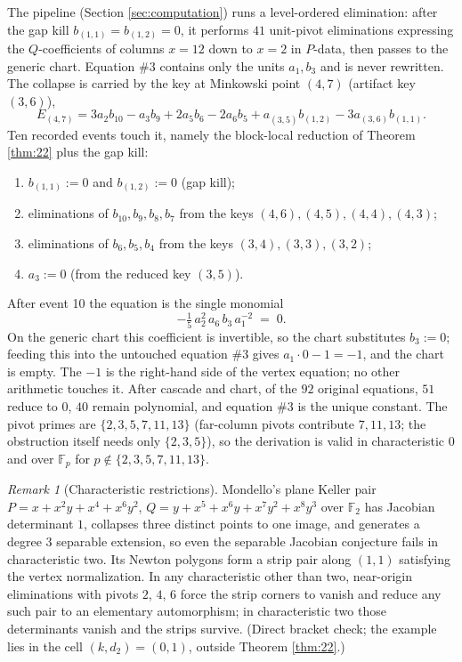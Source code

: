 \documentclass[11pt]{article}
\theoremstyle{definition}
\theoremstyle{remark}
\newtheorem{remark}[theorem]{Remark}
\begin{document}
The pipeline (Section \ref{sec:computation}) runs a level-ordered elimination: after the gap kill $b_{(1,1)}=b_{(1,2)}=0$, it performs $41$ unit-pivot eliminations expressing the $Q$-coefficients of columns $x=12$ down to $x=2$ in $P$-data, then passes to the generic chart. Equation $\#3$ contains only the units $a_1,b_3$ and is never rewritten. The collapse is carried by the key at Minkowski point $(4,7)$ (artifact key $(3,6)$),
\[
E_{(4,7)}=3a_2b_{10}-a_3b_9+2a_5b_6-2a_6b_5+a_{(3,5)}b_{(1,2)}-3a_{(3,6)}b_{(1,1)} .
\]
Ten recorded events touch it, namely the block-local reduction of Theorem \ref{thm:22} plus the gap kill:
\begin{enumerate}
\item[1--2.] $b_{(1,1)}:=0$ and $b_{(1,2)}:=0$ (gap kill);
\item[3--6.] eliminations of $b_{10},b_9,b_8,b_7$ from the keys $(4,6),(4,5),(4,4),(4,3)$;
\item[7--9.] eliminations of $b_6,b_5,b_4$ from the keys $(3,4),(3,3),(3,2)$;
\item[10.] $a_3:=0$ (from the reduced key $(3,5)$).
\end{enumerate}
After event 10 the equation is the single monomial
\[
-\tfrac{1}{5}\,a_2^2\,a_6\,b_3\,a_1^{-2}\;=\;0 .
\]
On the generic chart this coefficient is invertible, so the chart substitutes $b_3:=0$; feeding this into the untouched equation $\#3$ gives $a_1\cdot 0-1=-1$, and the chart is empty. The $-1$ is the right-hand side of the vertex equation; no other arithmetic touches it. After cascade and chart, of the $92$ original equations, $51$ reduce to $0$, $40$ remain polynomial, and equation $\#3$ is the unique constant. The pivot primes are $\{2,3,5,7,11,13\}$ (far-column pivots contribute $7,11,13$; the obstruction itself needs only $\{2,3,5\}$), so the derivation is valid in characteristic $0$ and over $\mathbb{F}_p$ for $p\notin\{2,3,5,7,11,13\}$.

\begin{remark}[Characteristic restrictions]
Mondello's plane Keller pair $P = x + x^2y + x^4 + x^6y^2$, $Q = y + x^5 + x^6y + x^7y^2 + x^8y^3$ over $\mathbb{F}_2$ \cite{Mondello} has Jacobian determinant $1$, collapses three distinct points to one image, and generates a degree $3$ separable extension, so even the separable Jacobian conjecture fails in characteristic two. Its Newton polygons form a strip pair along $(1,1)$ satisfying the vertex normalization. In any characteristic other than two, near-origin eliminations with pivots $2$, $4$, $6$ force the strip corners to vanish and reduce any such pair to an elementary automorphism; in characteristic two those determinants vanish and the strips survive. (Direct bracket check; the example lies in the cell $(k,d_2)=(0,1)$, outside Theorem \ref{thm:22}.)
\end{remark}
\end{document}

